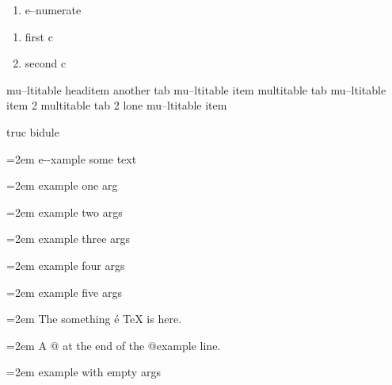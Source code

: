 \documentclass{book}
\begin{document}
\begin{titlepage}
\begin{enumerate}[label=\alph*.]
\item e--numerate
\end{enumerate}

\begin{enumerate}[label=\alph*.,start=3]
\item first c
\item second c
\end{enumerate}

mu--ltitable headitem another tab
mu--ltitable item multitable tab
mu--ltitable item 2 multitable tab 2
%
lone mu--ltitable item

truc bidule

\par\begingroup\obeylines\obeyspaces\frenchspacing\leftskip=2em\relax\parskip=0pt\relax\ttfamily{}%
e{-}{-}xample  some
   text
\endgroup{}%

\par\begingroup\obeylines\obeyspaces\frenchspacing\leftskip=2em\relax\parskip=0pt\relax\ttfamily{}%
example one arg
\endgroup{}%

\par\begingroup\obeylines\obeyspaces\frenchspacing\leftskip=2em\relax\parskip=0pt\relax\ttfamily{}%
example two args
\endgroup{}%

\par\begingroup\obeylines\obeyspaces\frenchspacing\leftskip=2em\relax\parskip=0pt\relax\ttfamily{}%
example three args
\endgroup{}%

\par\begingroup\obeylines\obeyspaces\frenchspacing\leftskip=2em\relax\parskip=0pt\relax\ttfamily{}%
example four args
\endgroup{}%

\par\begingroup\obeylines\obeyspaces\frenchspacing\leftskip=2em\relax\parskip=0pt\relax\ttfamily{}%
example five args
\endgroup{}%

\par\begingroup\obeylines\obeyspaces\frenchspacing\leftskip=2em\relax\parskip=0pt\relax\ttfamily{}%
The something \'{e} \TeX{} is here.
\endgroup{}%

\par\begingroup\obeylines\obeyspaces\frenchspacing\leftskip=2em\relax\parskip=0pt\relax\ttfamily{}%
A @ at the end of the @example line.
\endgroup{}%

\par\begingroup\obeylines\obeyspaces\frenchspacing\leftskip=2em\relax\parskip=0pt\relax\ttfamily{}%
example with empty args
\endgroup{}%


\end{titlepage}
\end{document}
